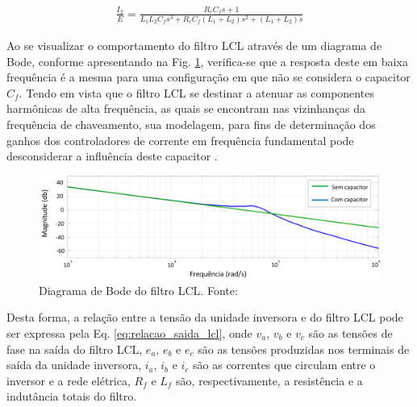 \begin{align}\label{eq:funcao_tranf_lcl}
	\frac{I_2}{E} = \frac{R_cC_fs + 1}{L_1L_2C_fs^3 + R_cC_f(L_1 + L_2)s^2 + (L_1 + L_2)s}
\end{align}

Ao se visualizar o comportamento do filtro LCL através de um diagrama de Bode, conforme apresentando na Fig. \ref{fig:Diagrama_Bode_LCL}, verifica-se que a resposta deste em baixa frequência é a mesma para uma configuração em que não se considera o capacitor $C_f$. Tendo em vista que o filtro LCL se destinar a atenuar as componentes harmônicas de alta frequência, as quais se encontram nas vizinhanças da frequência de chaveamento, sua modelagem, para fins de determinação dos ganhos dos controladores de corrente em frequência fundamental pode desconsiderar a influência deste capacitor \cite{TeseProfAlex}.

\begin{figure}[!hbt]
	\begin{center}
		\includegraphics[width=\columnwidth]{figuras/Diagrama_Bode_Filtro_LCL.png}
		\caption{Diagrama de Bode do filtro LCL. Fonte: \cite{TeseProfAlex}}
		\label{fig:Diagrama_Bode_LCL}
	\end{center}
\end{figure}

Desta forma, a relação entre a tensão da unidade inversora e do filtro LCL pode ser expressa pela Eq. \ref{eq:relacao_saida_lcl}, onde $v_a$, $v_b$ e $v_c$ são as tensões de fase na saída do filtro LCL, $e_a$, $e_b$ e $e_c$ são as tensões produzidas nos terminais de saída da unidade inversora, $i_a$, $i_b$ e $i_c$ são as correntes que circulam entre o inversor e a rede elétrica, $R_f$ e $L_f$ são, respectivamente, a resistência e a indutância totais do filtro.


